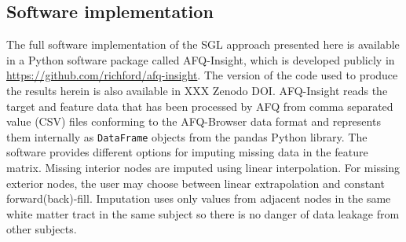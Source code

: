 \subsection*{Software implementation}

The full software implementation of the SGL approach presented here is available
in a Python software package called AFQ-Insight, which is developed publicly in
\url{https://github.com/richford/afq-insight}. The version of the code used to
produce the results herein is also available in XXX Zenodo DOI. AFQ-Insight
reads the target and feature data that has been processed by AFQ from comma
separated value (CSV) files conforming to the AFQ-Browser data
format\cite{yeatman2018browser} and represents them internally as
\lstinline{DataFrame} objects from the pandas Python
library\cite{mckinney2010data}. The software provides different options for
imputing missing data in the feature matrix. Missing interior nodes are imputed
using linear interpolation. For missing exterior nodes, the user may choose
between linear extrapolation and constant forward(back)-fill. Imputation uses
only values from adjacent nodes in the same white matter tract in the same
subject so there is no danger of data leakage from other subjects.
